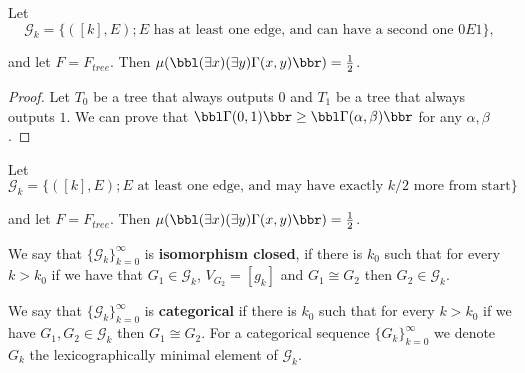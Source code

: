 \begin{exam}
Let \[\mathcal{G}_k=\{([k],E);\text{$E$ has at least one edge, and can have a second one $0E1$}\},\]

and let $F=F_{tree}$. Then $\mu(\bbl(\exists x)(\exists y)\Gamma(x,y)\bbr)=\frac{1}{2}$.
\end{exam}
\begin{proof}
Let $T_0$ be a tree that always outputs $0$ and $T_1$ be a tree that always outputs $1$. We can prove that $\bbl\Gamma(0,1)\bbr\geq\bbl\Gamma(\alpha,\beta)\bbr$ for any $\alpha,\beta$. 
\end{proof}

\begin{exam}
Let \[\mathcal{G}_k=\{([k],E);\text{$E$ at least one edge, and may have exactly $k/2$ more from start}\}\]

and let $F=F_{tree}$. Then $\mu(\bbl(\exists x)(\exists y)\Gamma(x,y)\bbr)=\frac{1}{2}$.
\end{exam}

\begin{defi}
We say that $\{\mathcal{G}_k\}_{k=0}^\infty$ is \textbf{isomorphism closed}, if there is $k_0$ such that for every $k>k_0$ if we have that $G_1\in\mathcal{G}_k$, $V_{G_2}=[g_k]$ and $G_1\cong G_2$ then $G_2\in\mathcal{G}_k$.

We say that $\{\mathcal{G}_k\}_{k=0}^\infty$ is \textbf{categorical} if there is $k_0$ such that for every $k>k_0$ if we have $G_1,G_2\in\mathcal{G}_k$ then $G_1\cong G_2$. For a categorical sequence $\{G_k\}_{k=0}^\infty$ we denote $G_k$ the lexicographically minimal element of $\mathcal{G}_k$.
\end{defi}

